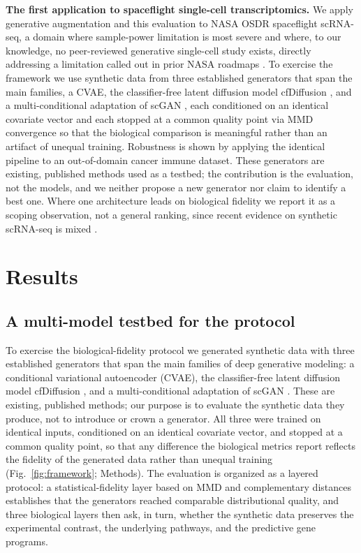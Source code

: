 \documentclass[11pt]{article}
\newcommand{\protname}{biological-fidelity protocol}
\begin{document}
\noindent\textbf{The first application to spaceflight single-cell transcriptomics.} We apply generative augmentation and this evaluation to NASA OSDR spaceflight scRNA-seq, a domain where sample-power limitation is most severe and where, to our knowledge, no peer-reviewed generative single-cell study exists, directly addressing a limitation called out in prior NASA roadmaps \cite{scott,ilangovan}. To exercise the framework we use synthetic data from three established generators that span the main families, a CVAE, the classifier-free latent diffusion model cfDiffusion \cite{cfdiffusion}, and a multi-conditional adaptation of scGAN \cite{scgan}, each conditioned on an identical covariate vector and each stopped at a common quality point via MMD convergence so that the biological comparison is meaningful rather than an artifact of unequal training. Robustness is shown by applying the identical pipeline to an out-of-domain cancer immune dataset. These generators are existing, published methods used as a testbed; the contribution is the evaluation, not the models, and we neither propose a new generator nor claim to identify a best one. Where one architecture leads on biological fidelity we report it as a scoping observation, not a general ranking, since recent evidence on synthetic scRNA-seq is mixed \cite{cfgen,scgft,scdiffusion}.

\section{Results}

\subsection{A multi-model testbed for the protocol}
To exercise the \protname{} we generated synthetic data with three established generators that span the main families of deep generative modeling: a conditional variational autoencoder (CVAE), the classifier-free latent diffusion model cfDiffusion \cite{cfdiffusion}, and a multi-conditional adaptation of scGAN \cite{scgan}. These are existing, published methods; our purpose is to evaluate the synthetic data they produce, not to introduce or crown a generator. All three were trained on identical inputs, conditioned on an identical covariate vector, and stopped at a common quality point, so that any difference the biological metrics report reflects the fidelity of the generated data rather than unequal training (Fig.~\ref{fig:framework}; Methods). The evaluation is organized as a layered protocol: a statistical-fidelity layer based on MMD and complementary distances establishes that the generators reached comparable distributional quality, and three biological layers then ask, in turn, whether the synthetic data preserves the experimental contrast, the underlying pathways, and the predictive gene programs.
\end{document}
